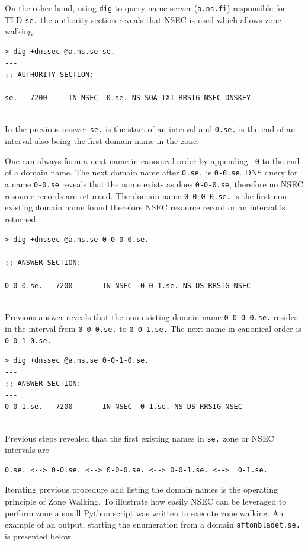 On the other hand, using \texttt{dig} to query name server (\texttt{a.ns.fi}) responsible for TLD \texttt{se.} the authority section reveals that NSEC is used which allows zone walking.

\begin{verbatim}
> dig +dnssec @a.ns.se se.
---
;; AUTHORITY SECTION:
---
se.   7200	   IN NSEC 	0.se. NS SOA TXT RRSIG NSEC DNSKEY
---
\end{verbatim}

In the previous answer \texttt{se.} is the start of an interval and \texttt{0.se.} is the end of an interval also being the first domain name in the zone.

One can always form a next name in canonical order by appending \texttt{-0} to the end of a domain name. The next domain name after \texttt{0.se.} is \texttt{0-0.se}. DNS query for a name \texttt{0-0.se} reveals that the name exists as does \texttt{0-0-0.se}, therefore no NSEC resource records are returned. The domain name \texttt{0-0-0-0.se.} is the first non-existing domain name found therefore NSEC resource record or an interval is returned:
\begin{verbatim}
> dig +dnssec @a.ns.se 0-0-0-0.se.
---
;; ANSWER SECTION:
---
0-0-0.se.   7200	   IN NSEC 	0-0-1.se. NS DS RRSIG NSEC
---
\end{verbatim}

Previous answer reveals that the non-existing domain name \texttt{0-0-0-0.se.} resides in the interval from \texttt{0-0-0.se.} to \texttt{0-0-1.se.} The next name in canonical order is \texttt{0-0-1-0.se.}

\begin{verbatim}
> dig +dnssec @a.ns.se 0-0-1-0.se.
---
;; ANSWER SECTION:
---
0-0-1.se.   7200	   IN NSEC 	0-1.se. NS DS RRSIG NSEC
---
\end{verbatim}

Previous steps revealed that the first existing names in \texttt{se.} zone or NSEC intervals are

\begin{verbatim}
0.se. <--> 0-0.se. <--> 0-0-0.se. <--> 0-0-1.se. <-->  0-1.se.
\end{verbatim}

Iterating previous procedure and listing the domain names is the operating principle of Zone Walking. To illustrate how easily NSEC can be leveraged to perform zone a small Python script was written to execute zone walking. An example of an output, starting the enumeration from a domain \texttt{aftonbladet.se.} is presented below.

